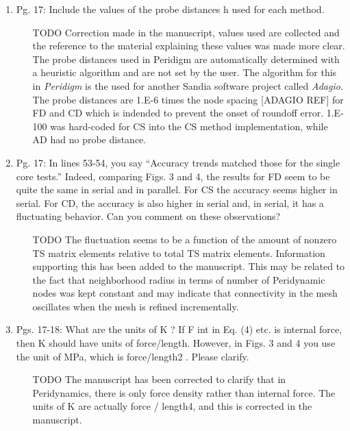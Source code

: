 \documentclass{article}
\begin{document}
\begin{enumerate}
  \item
    Pg. 17: Include the values of the probe distances h used for each method.

{\color{red}  
\begin{itemize}
     \item
[TODO]
    Correction made in the manuscript, values used are collected and the reference to the material explaining these values was made more clear.
    The probe distances used in Peridigm are automatically determined with a
    heuristic algorithm and are not set by the user. The algorithm for this in
    \emph{Peridigm} is the used for another Sandia software project called
    \emph{Adagio}. The probe distances are 1.E-6 times the node spacing [ADAGIO
    REF] for FD and CD which is indended to prevent the onset of roundoff error.
    1.E-100 was hard-coded for CS into the CS method implementation, while AD had no probe distance.
  \end{itemize}}

  \item
    Pg. 17: In lines 53-54, you say “Accuracy trends matched those for the single core
    tests.” Indeed, comparing Figs. 3 and 4, the results for FD seem to be quite the
    same in serial and in parallel. For CS the accuracy seems higher in serial. For CD,
    the accuracy is also higher in serial and, in serial, it has a ﬂuctuating behavior. Can
    you comment on these observations?

{\color{red}  
\begin{itemize}
     \item
[TODO]
	The fluctuation seems to be a function of the amount of nonzero TS matrix elements relative to total TS matrix elements. Information supporting this has been added to the manuscript. This may be related to the fact that neighborhood radius in terms of number of Peridynamic nodes was kept constant and may indicate that connectivity in the mesh oscillates when the mesh is refined incrementally. 
  \end{itemize}}

  \item
    Pgs. 17-18: What are the units of K ? If F int in Eq. (4) etc. is internal force, then K
    should have units of force/length. However, in Figs. 3 and 4 you use the unit of
    MPa, which is force/length2 . Please clarify.

{\color{red}  
\begin{itemize}
     \item
[TODO]
    The manuscript has been corrected to clarify that in Peridynamics, there is only force density rather than internal force. The units of K are actually force / length4, and this is corrected in the manuscript.
  \end{itemize}}


\end{enumerate}
\end{document}
